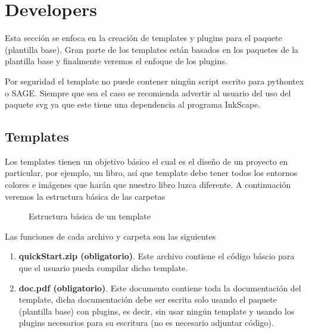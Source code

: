 {	\section{Developers}
	Esta sección se enfoca en la creación de templates y plugins para el paquete \printproject\space (plantilla base). Gran parte de los templates están basados en los paquetes de la plantilla base y finalmente veremos el enfoque de los plugins.
	\begin{boxbasic}[Nota]
		Por seguridad el template no puede contener ningún script escrito para pythontex o SAGE. Siempre que sea el caso se recomienda advertir al usuario del uso del paquete svg ya que este tiene una dependencia al programa InkScape. 
	\end{boxbasic}
	\subsection{Templates}
	Los templates tienen un objetivo básico el cual es el diseño de un proyecto en particular, por ejemplo, un libro, así que template debe tener todos los entornos colores e imágenes que harán que nuestro libro luzca diferente. A continuación veremos la estructura básica de las carpetas
	\begin{figure}[H]
		\caption{Estructura básica de un template}
		\label{fig:EstructuraTemplate}
	\end{figure} 
	Las funciones de cada archivo y carpeta son las siguientes
	\begin{enumerate}
		\item \textbf{quickStart.zip (obligatorio)}. Este archivo contiene el código báscio para que el usuario pueda compilar dicho template.
		\item \textbf{doc.pdf (obligatorio)}. Este documento contiene toda la documentación del template, dicha documentación debe ser escrita solo usando el paquete \printproject\space (plantilla base) con plugins, es decir, sin usar ningún template y usando los plugins necesarios para su escritura (no es necesario adjuntar código).

\end{enumerate}}

